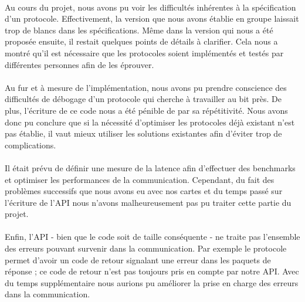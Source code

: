 \paragraph{}
Au cours du projet, nous avons pu voir les difficultés inhérentes à la
spécification d'un protocole. Effectivement, la version que nous avons établie
en groupe laissait trop de blancs dans les spécifications. Même dans la
version qui nous a été proposée ensuite, il restait quelques points de détails
à clarifier. Cela nous a montré qu'il est nécessaire que les protocoles
soient implémentés et testés par différentes personnes afin de les éprouver.

\paragraph{}
Au fur et à mesure de l'implémentation, nous avons pu prendre conscience des
difficultés de débogage d'un protocole qui cherche à travailler au bit près.
De plus, l'écriture de ce code nous a été pénible de par sa répétitivité. Nous
avons donc pu conclure que si la nécessité d'optimiser les protocoles déjà
existant n'est pas établie, il vaut mieux utiliser les solutions existantes
afin d'éviter trop de complications.

\paragraph{}
Il était prévu de définir une mesure de la latence afin d'effectuer des
benchmarks et optimiser les performances de la communication. Cependant, du
fait des problèmes successifs que nous avons eu avec nos cartes et du temps
passé sur l'écriture de l'API nous n'avons malheureusement pas pu traiter
cette partie du projet.

\paragraph{}
Enfin, l'API - bien que le code soit de taille conséquente - ne traite pas
l'ensemble des erreurs pouvant survenir dans la communication. Par exemple le
protocole permet d'avoir un code de retour signalant une erreur dans les
paquets de réponse ; ce code de retour n'est pas toujours pris en compte par
notre API. Avec du temps supplémentaire nous aurions pu améliorer la prise en
charge des erreurs dans la communication.
